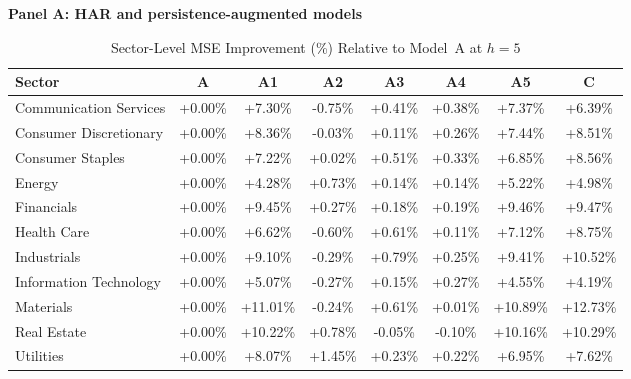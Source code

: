 
\begin{table}[htbp]
\centering
\caption{Sector-Level MSE Improvement (\%) Relative to Model~A at $h=5$}
\label{tab:sector_split}
\footnotesize
\setlength{\tabcolsep}{3pt}
\textbf{Panel A: HAR and persistence-augmented models}\par\smallskip
\begin{tabular*}{\linewidth}{@{\extracolsep{\fill}}lccccccc@{}}
\toprule
Sector & A & A1 & A2 & A3 & A4 & A5 & C \\
\midrule
Communication Services & +0.00\% & +7.30\% & -0.75\% & +0.41\% & +0.38\% & +7.37\% & +6.39\% \\
Consumer Discretionary & +0.00\% & +8.36\% & -0.03\% & +0.11\% & +0.26\% & +7.44\% & +8.51\% \\
Consumer Staples & +0.00\% & +7.22\% & +0.02\% & +0.51\% & +0.33\% & +6.85\% & +8.56\% \\
Energy & +0.00\% & +4.28\% & +0.73\% & +0.14\% & +0.14\% & +5.22\% & +4.98\% \\
Financials & +0.00\% & +9.45\% & +0.27\% & +0.18\% & +0.19\% & +9.46\% & +9.47\% \\
Health Care & +0.00\% & +6.62\% & -0.60\% & +0.61\% & +0.11\% & +7.12\% & +8.75\% \\
Industrials & +0.00\% & +9.10\% & -0.29\% & +0.79\% & +0.25\% & +9.41\% & +10.52\% \\
Information Technology & +0.00\% & +5.07\% & -0.27\% & +0.15\% & +0.27\% & +4.55\% & +4.19\% \\
Materials & +0.00\% & +11.01\% & -0.24\% & +0.61\% & +0.01\% & +10.89\% & +12.73\% \\
Real Estate & +0.00\% & +10.22\% & +0.78\% & -0.05\% & -0.10\% & +10.16\% & +10.29\% \\
Utilities & +0.00\% & +8.07\% & +1.45\% & +0.23\% & +0.22\% & +6.95\% & +7.62\% \\
\bottomrule
\end{tabular*}


\end{table}
